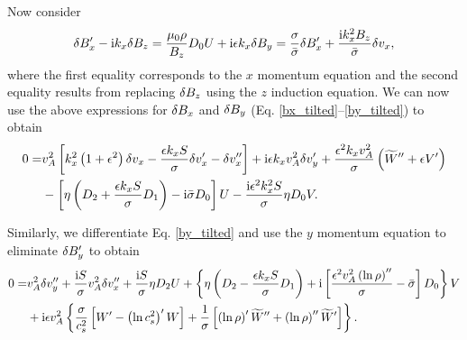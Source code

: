Now consider
\begin{align}
  \delta B_x^\prime - \mathrm{i} k_x \delta B_z = \frac{\mu_0\rho}{B_z}D_0U +
  \mathrm{i}\epsilon k_x \delta B_y = \frac{\sigma}{\bar{\sigma}}\delta B_x^\prime +
  \frac{\mathrm{i} k_x^2B_z}{\bar{\sigma}}\delta v_x,
\end{align}
where the first equality corresponds to the $x$ momentum equation and
the second equality results from replacing $\delta B_z$ using the $z$
induction equation. We can now use the above expressions for $\delta B_x$
and $\delta B_y$ (Eq. \ref{bx_tilted}--\ref{by_tilted}) to obtain
\begin{align}
0 = &v_A^2\left[k_x^2\left(1+\epsilon^2\right)\dvx - \frac{\epsilon k_x
  S}{\sigma}\dvx^\prime - \dvx^{\prime\prime}\right] + \imgi\epsilon
k_x v_A^2 \dvy^\prime + \frac{\epsilon^2 k_x
  v_A^2}{\sigma}\left(\w^{\prime\prime} + \epsilon V^\prime\right) 
\notag\\ &-\left[\eta\left(D_2 + \frac{\epsilon k_x S}{\sigma}D_1\right) -
  \imgi\sbar D_0 \right]U %
- \frac{\imgi\epsilon^2k_x^2S}{\sigma}\eta D_0V.
\end{align}

Similarly, we differentiate Eq. \ref{by_tilted} and use the $y$
momentum equation to eliminate $\delta B_y^\prime$ to obtain
\begin{align}
0 = &v_A^2\delta v_y^{\prime\prime} + \frac{\mathrm{i} S}{\sigma}v_A^2
\delta v_x^{\prime\prime} +\frac{\mathrm{i} S}{\sigma}\eta D_2U +
\left\{\eta\left(D_2 - \frac{\epsilon k_x S}{\sigma} D_1\right) +
  \mathrm{i}\left[\frac{\epsilon^2v_A^2\left(\ln{\rho}\right)^{\prime\prime}}{\sigma}
    - \bar{\sigma}\right]D_0\right\}V \notag\\ &+ \mathrm{i}\epsilon
  v_A^2\left\{\frac{\sigma}{c_s^2}\left[W^\prime -
    \left(\ln{c_s^2}\right)^\prime W\right] +
    \frac{1}{\sigma}\left[\left(\ln{\rho}\right)^\prime\widetilde{W}^{\prime\prime}
      +\left(\ln{\rho}\right)^{\prime\prime}\widetilde{W}^{\prime} \right]\right\}.    
\end{align}

